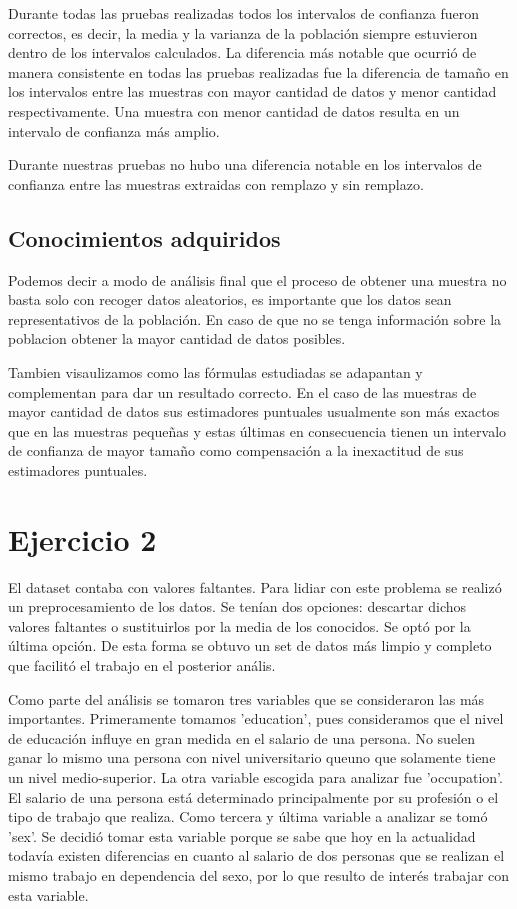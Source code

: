 \documentclass[10pt,twocolumn,a4paper]{article}
\begin{document}
Durante todas las pruebas realizadas todos los intervalos de confianza fueron correctos, es decir, la media y la varianza de la poblaci\'on siempre estuvieron dentro de los intervalos calculados.
La diferencia m\'as notable que ocurri\'o de manera consistente en todas las pruebas realizadas fue la diferencia de tama\~no en los intervalos entre las muestras con mayor cantidad de datos y menor cantidad respectivamente. Una muestra con menor cantidad de datos resulta en un intervalo de confianza m\'as amplio.

Durante nuestras pruebas no hubo una diferencia notable en los intervalos de confianza entre las muestras extraidas con remplazo y sin remplazo.

\subsection*{Conocimientos adquiridos}
Podemos decir a modo de an\'alisis final que el proceso de obtener una muestra no basta solo con recoger datos aleatorios, es importante que los datos sean representativos de la poblaci\'on. En caso de que no se tenga informaci\'on sobre la poblacion obtener la mayor cantidad de datos posibles.

Tambien visaulizamos como las f\'ormulas estudiadas se adapantan y complementan para dar un resultado correcto. En el caso de las muestras de mayor cantidad de datos sus estimadores puntuales usualmente son m\'as exactos que en las muestras peque\~nas y estas \'ultimas en consecuencia tienen un intervalo de confianza de mayor tamaño como compensaci\'on a la inexactitud de sus estimadores puntuales.

\section*{Ejercicio 2} 

El dataset contaba con valores faltantes. Para lidiar con este problema se realiz\'o un preprocesamiento de los datos. Se ten\'ian dos opciones: descartar dichos valores faltantes o sustituirlos por la media de los conocidos. Se opt\'o por la \'ultima opci\'on. De esta forma se obtuvo un set de datos m\'as limpio y completo que facilit\'o el trabajo en el posterior an\'alis.

Como parte del an\'alisis se tomaron tres variables que se consideraron las m\'as importantes. Primeramente tomamos 'education', pues consideramos que el nivel de educación influye en gran medida en el salario de una persona. No suelen ganar lo mismo una persona con nivel universitario queuno que solamente tiene un nivel medio-superior. La otra variable escogida para analizar fue 'occupation'. El salario de una persona est\'a determinado principalmente por su profesi\'on o el tipo de trabajo que realiza. Como tercera y \'ultima  variable a analizar se tom\'o 'sex'. Se decidi\'o tomar esta variable porque se sabe que hoy en la actualidad todav\'ia existen diferencias en cuanto al salario de dos personas que se realizan el mismo trabajo en dependencia del sexo, por lo que resulto de inter\'es trabajar con esta variable.
\end{document}
